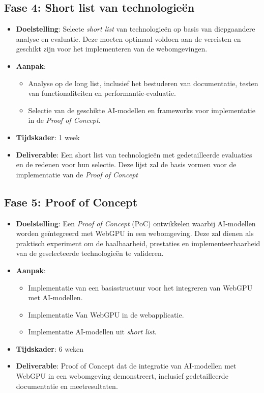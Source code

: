 \subsection*{Fase 4: Short list van technologieën}
\begin{itemize}
  \item \textbf{Doelstelling}: Selecte \textit{short list} van technologieën op basis van diepgaandere analyse en evaluatie. Deze moeten optimaal voldoen aan de vereisten en geschikt zijn voor het implementeren van de webomgevingen.

  \item \textbf{Aanpak}:
  \begin{itemize}
    \item Analyse op de long list, inclusief het bestuderen van documentatie, testen van functionaliteiten en performantie-evaluatie.
    \item Selectie van de geschikte AI-modellen en frameworks voor implementatie in de \textit{Proof of Concept}.
  \end{itemize}

  \item \textbf{Tijdskader}: 1 week
  \item \textbf{Deliverable}: Een short list van technologieën met gedetailleerde evaluaties en de redenen voor hun selectie. Deze lijst zal de basis vormen voor de implementatie van de \textit{Proof of Concept}
\end{itemize}

\subsection*{Fase 5: Proof of Concept}

\begin{itemize}
  \item \textbf{Doelstelling}: Een \textit{Proof of Concept} (PoC) ontwikkelen waarbij AI-modellen worden geïntegreerd met WebGPU in een webomgeving. Deze zal dienen als praktisch experiment om de haalbaarheid, prestaties en implementeerbaarheid van de geselecteerde technologieën te valideren.

  \item \textbf{Aanpak}:
  \begin{itemize}
    \item Implementatie van een basisstructuur voor het integreren van WebGPU met AI-modellen.
    \item Implementatie Van WebGPU in de webapplicatie.
    \item Implementatie AI-modellen uit \textit{short list}.
  \end{itemize}

  \item \textbf{Tijdskader}: 6 weken
  \item \textbf{Deliverable}: Proof of Concept dat de integratie van AI-modellen met WebGPU in een webomgeving demonstreert, inclusief gedetailleerde documentatie en meetresultaten.
\end{itemize}

